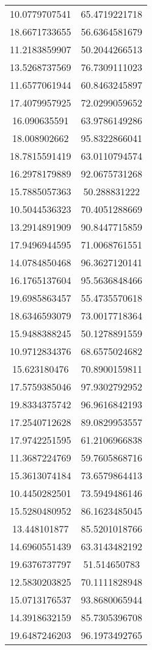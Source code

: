 \begin{table}
\begin{tabular}{cc}
10.0779707541 & 65.4719221718 \\
18.6671733655 & 56.6364581679 \\
11.2183859907 & 50.2044266513 \\
13.5268737569 & 76.7309111023 \\
11.6577061944 & 60.8463245897 \\
17.4079957925 & 72.0299059652 \\
16.090635591 & 63.9786149286 \\
18.008902662 & 95.8322866041 \\
18.7815591419 & 63.0110794574 \\
16.2978179889 & 92.0675731268 \\
15.7885057363 & 50.288831222 \\
10.5044536323 & 70.4051288669 \\
13.2914891909 & 90.8447715859 \\
17.9496944595 & 71.0068761551 \\
14.0784850468 & 96.3627120141 \\
16.1765137604 & 95.5636848466 \\
19.6985863457 & 55.4735570618 \\
18.6346593079 & 73.0017718364 \\
15.9488388245 & 50.1278891559 \\
10.9712834376 & 68.6575024682 \\
15.623180476 & 70.8900159811 \\
17.5759385046 & 97.9302792952 \\
19.8334375742 & 96.9616842193 \\
17.2540712628 & 89.0829953557 \\
17.9742251595 & 61.2106966838 \\
11.3687224769 & 59.7605868716 \\
15.3613074184 & 73.6579864413 \\
10.4450282501 & 73.5949486146 \\
15.5280480952 & 86.1623485045 \\
13.448101877 & 85.5201018766 \\
14.6960551439 & 63.3143482192 \\
19.6376737797 & 51.514650783 \\
12.5830203825 & 70.1111828948 \\
15.0713176537 & 93.8680065944 \\
14.3918632159 & 85.7305396708 \\
19.6487246203 & 96.1973492765 \\

\end{tabular}
\end{table}

